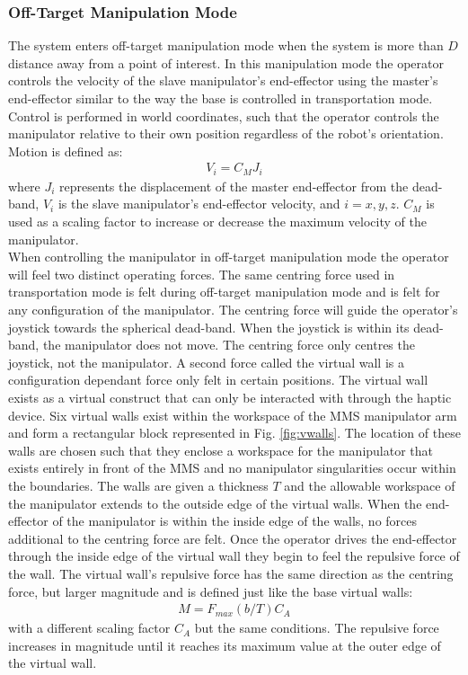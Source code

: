 \documentclass[onecolumn,10pt,final]{asme2ej}
\begin{document}
\subsubsection{Off-Target Manipulation Mode}

The system enters off-target manipulation mode when the system is more than $D$ distance away from a point of interest. In this manipulation mode the operator controls the velocity of the slave manipulator's end-effector using the master's end-effector similar to the way the base is controlled in transportation mode. Control is performed in world coordinates, such that the operator controls the manipulator relative to their own position regardless of the robot's orientation. Motion is defined as:
\begin{align}
V_i = C_MJ_i
\end{align}
where $J_i$ represents the displacement of the master end-effector from the dead-band, $V_i$ is the slave manipulator's end-effector velocity, and $i=x,y,z$. $C_M$ is used as a scaling factor to increase or decrease the maximum velocity of the manipulator.\\

When controlling the manipulator in off-target manipulation mode the operator will feel two distinct operating forces. The same centring force used in transportation mode is felt during off-target manipulation mode and is felt for any configuration of the manipulator. The centring force will guide the operator's joystick towards the spherical dead-band. When the joystick is within its dead-band, the manipulator does not move. The centring force only centres the joystick, not the manipulator. A second force called the virtual wall is a configuration dependant force only felt in certain positions. The virtual wall exists as a virtual construct that can only be interacted with through the haptic device. Six virtual walls exist within the workspace of the MMS manipulator arm and form a rectangular block represented in Fig. \ref{fig:vwalls}. The location of these walls are chosen such that they enclose a workspace for the manipulator that exists entirely in front of the MMS and no manipulator singularities occur within the boundaries. The walls are given a thickness $T$ and the allowable workspace of the manipulator extends to the outside edge of the virtual walls. When the end-effector of the manipulator is within the inside edge of the walls, no forces additional to the centring force are felt. Once the operator drives the end-effector through the inside edge of the virtual wall they begin to feel the repulsive force of the wall. The virtual wall's repulsive force has the same direction as the centring force, but larger magnitude and is defined just like the base virtual walls:
\begin{align}
M = F_{max}(b/T)C_A
\end{align}
with a different scaling factor $C_A$ but the same conditions. The repulsive force increases in magnitude until it reaches its maximum value at the outer edge of the virtual wall.\\
\end{document}
